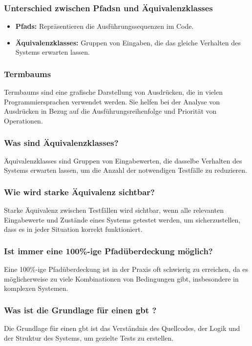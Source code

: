 \documentclass[main.tex]{subfiles}
\begin{document}
\subsubsection*{Unterschied zwischen \glspl{Pfad}n und \glspl{Äquivalenzklasse}}
\begin{itemize}
    \item \textbf{\glspl{Pfad}:} Repräsentieren die Ausführungssequenzen im Code.
    \item \textbf{\glspl{Äquivalenzklasse}:} Gruppen von Eingaben, die das gleiche Verhalten des Systems erwarten lassen.
\end{itemize}


\subsubsection*{\glspl{Termbaum}}
\glspl{Termbaum} sind eine grafische Darstellung von Ausdrücken, die in vielen Programmiersprachen verwendet werden. Sie helfen bei der Analyse von Ausdrücken in Bezug auf die Ausführungsreihenfolge und Priorität von Operationen.


\subsubsection*{Was sind \glspl{Äquivalenzklasse}?}
\glspl{Äquivalenzklasse} sind Gruppen von Eingabewerten, die dasselbe Verhalten des Systems erwarten lassen, um die Anzahl der notwendigen Testfälle zu reduzieren.


\subsubsection*{Wie wird starke Äquivalenz sichtbar?}
Starke Äquivalenz zwischen Testfällen wird sichtbar, wenn alle relevanten Eingabewerte und Zustände eines Systems getestet werden, um sicherzustellen, dass es in jeder Situation korrekt funktioniert.


\subsubsection*{Ist immer eine 100\%-ige \gls{Pfadüberdeckung} möglich?}
Eine 100\%-ige \gls{Pfadüberdeckung} ist in der Praxis oft schwierig zu erreichen, da es möglicherweise zu viele Kombinationen von Bedingungen gibt, insbesondere in komplexen Systemen.

\subsubsection*{Was ist die Grundlage für einen \gls{gbt} ?}
Die Grundlage für einen \gls{gbt}  ist das Verständnis des Quellcodes, der Logik und der Struktur des Systems, um gezielte Tests zu erstellen.
\end{document}
